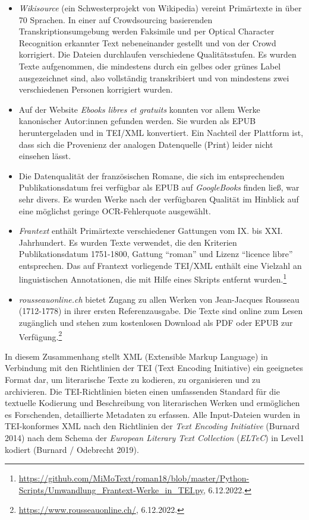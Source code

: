 \documentclass[
  12pt,
  letterpaper,
  DIV=11,
  numbers=noendperiod]{scrreprt}
\providecommand{\tightlist}{%
  \setlength{\itemsep}{0pt}\setlength{\parskip}{0pt}}\usepackage{longtable,booktabs,array}
\begin{document}
\begin{itemize}
\tightlist
\item
  \emph{Wikisource} (ein Schwesterprojekt von Wikipedia) vereint
  Primärtexte in über 70 Sprachen. In einer auf Crowdsourcing
  basierenden Transkriptionsumgebung werden Faksimile und per Optical
  Character Recognition erkannter Text nebeneinander gestellt und von
  der Crowd korrigiert. Die Dateien durchlaufen verschiedene
  Qualitätsstufen. Es wurden Texte aufgenommen, die mindestens durch ein
  gelbes oder grünes Label ausgezeichnet sind, also vollständig
  transkribiert und von mindestens zwei verschiedenen Personen
  korrigiert wurden.\\
\item
  Auf der Website \emph{Ebooks libres et gratuits} konnten vor allem
  Werke kanonischer Autor:innen gefunden werden. Sie wurden als EPUB
  heruntergeladen und in TEI/XML konvertiert. Ein Nachteil der Plattform
  ist, dass sich die Provenienz der analogen Datenquelle (Print) leider
  nicht einsehen lässt.\\
\item
  Die Datenqualität der französischen Romane, die sich im entsprechenden
  Publikationsdatum frei verfügbar als EPUB auf \emph{GoogleBooks}
  finden ließ, war sehr divers. Es wurden Werke nach der verfügbaren
  Qualität im Hinblick auf eine möglichst geringe OCR-Fehlerquote
  ausgewählt.\\
\item
  \emph{Frantext} enthält Primärtexte verschiedener Gattungen vom IX.
  bis XXI. Jahrhundert. Es wurden Texte verwendet, die den Kriterien
  Publikationsdatum 1751-1800, Gattung ``roman'' und Lizenz ``licence
  libre'' entsprechen. Das auf Frantext vorliegende TEI/XML enthält eine
  Vielzahl an linguistischen Annotationen, die mit Hilfe eines Skripts
  entfernt wurden.\footnote{\url{https://github.com/MiMoText/roman18/blob/master/Python-Scripts/Umwandlung_Frantext-Werke_in_TEI.py},
    6.12.2022.}\\
\item
  \emph{rousseauonline.ch} bietet Zugang zu allen Werken von
  Jean-Jacques Rousseau (1712-1778) in ihrer ersten Referenzausgabe. Die
  Texte sind online zum Lesen zugänglich und stehen zum kostenlosen
  Download als PDF oder EPUB zur Verfügung.\footnote{\url{https://www.rousseauonline.ch/},
    6.12.2022.}
\end{itemize}

In diesem Zusammenhang stellt XML (Extensible Markup Language) in
Verbindung mit den Richtlinien der TEI (Text Encoding Initiative) ein
geeignetes Format dar, um literarische Texte zu kodieren, zu
organisieren und zu archivieren. Die TEI-Richtlinien bieten einen
umfassenden Standard für die textuelle Kodierung und Beschreibung von
literarischen Werken und ermöglichen es Forschenden, detaillierte
Metadaten zu erfassen. Alle Input-Dateien wurden in TEI-konformes XML
nach den Richtlinien der \emph{Text Encoding Initiative} (Burnard 2014)
nach dem Schema der \emph{European Literary Text Collection}
(\emph{ELTeC}) in Level1 kodiert (Burnard / Odebrecht 2019).
\end{document}
